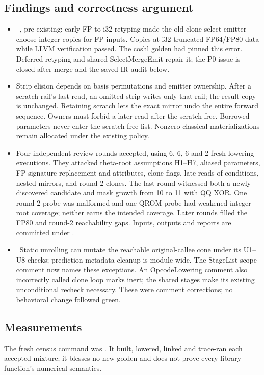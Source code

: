 \subsection*{Findings and correctness argument}
\begin{itemize}
  \item \fconfirmed\ , pre-existing: early FP-to-i32 retyping
  made the old clone select emitter choose integer copies for FP inputs. Copies
  at i32 truncated FP64/FP80 data while LLVM verification passed. The coshl golden
  had pinned this error. Deferred retyping and shared SelectMergeEmit repair it;
  the P0 issue is closed after merge and the saved-IR audit below.
  \item Strip elision depends on basis permutations and emitter ownership.
  After a scratch rail's last read, an omitted strip writes only that rail; the
  result copy is unchanged. Retaining scratch lets the exact mirror undo the
  entire forward sequence. Owners must forbid a later read after the scratch
  free. Borrowed parameters never enter the scratch-free list. Nonzero classical
  materializations remain allocated under the existing policy.
  \item Four independent review rounds accepted, using 6, 6, 6 and 2 fresh
  lowering executions. They attacked theta-root assumptions H1--H7, aliased
  parameters, FP signature replacement and attributes, clone flags, late reads
  of conditions, nested mirrors, and round-2 clones. The last round witnessed
  both a newly discovered candidate and mask growth from 10 to 11 with QQ XOR.
  One round-2 probe was malformed and one QROM probe had weakened integer-root
  coverage; neither earns the intended coverage. Later rounds filled the FP80
  and round-2 reachability gaps. Inputs, outputs and reports are committed under
  .
  \item \fdoc\ Static unrolling can mutate the reachable original-callee cone
  under its U1--U8 checks; prediction metadata cleanup is module-wide. The
  StageList scope comment now names these exceptions. An OpcodeLowering comment
  also incorrectly called clone loop marks inert; the shared stages make its
  existing unconditional recheck necessary. These were comment corrections;
  no behavioral change followed green.
\end{itemize}

\subsection*{Measurements}
The fresh census command was
.
It built, lowered, linked and trace-ran each accepted mixture; it blesses no new
golden and does not prove every library function's numerical semantics.


